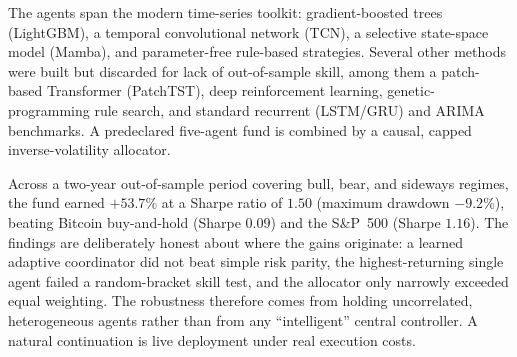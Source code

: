 The agents span the modern time-series toolkit: gradient-boosted trees (LightGBM), a temporal convolutional network (TCN), a selective state-space model (Mamba), and parameter-free rule-based strategies. Several other methods were built but discarded for lack of out-of-sample skill, among them a patch-based Transformer (PatchTST), deep reinforcement learning, genetic-programming rule search, and standard recurrent (LSTM/GRU) and ARIMA benchmarks. A predeclared five-agent fund is combined by a causal, capped inverse-volatility allocator.


Across a two-year out-of-sample period covering bull, bear, and sideways regimes, the fund earned $+53.7\%$ at a Sharpe ratio of $1.50$ (maximum drawdown $-9.2\%$), beating Bitcoin buy-and-hold (Sharpe $0.09$) and the S\&P~500 (Sharpe $1.16$). The findings are deliberately honest about where the gains originate: a learned adaptive coordinator did not beat simple risk parity, the highest-returning single agent failed a random-bracket skill test, and the allocator only narrowly exceeded equal weighting. The robustness therefore comes from holding uncorrelated, heterogeneous agents rather than from any ``intelligent'' central controller. A natural continuation is live deployment under real execution costs.
